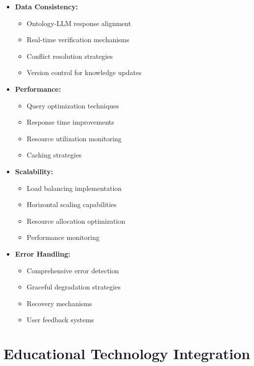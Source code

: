 \begin{itemize}
  \item \textbf{Data Consistency:} 
    \begin{itemize}
      \item Ontology-LLM response alignment
      \item Real-time verification mechanisms
      \item Conflict resolution strategies
      \item Version control for knowledge updates
    \end{itemize}
  
  \item \textbf{Performance:} 
    \begin{itemize}
      \item Query optimization techniques
      \item Response time improvements
      \item Resource utilization monitoring
      \item Caching strategies
    \end{itemize}
  
  \item \textbf{Scalability:} 
    \begin{itemize}
      \item Load balancing implementation
      \item Horizontal scaling capabilities
      \item Resource allocation optimization
      \item Performance monitoring
    \end{itemize}
  
  \item \textbf{Error Handling:} 
    \begin{itemize}
      \item Comprehensive error detection
      \item Graceful degradation strategies
      \item Recovery mechanisms
      \item User feedback systems
    \end{itemize}
\end{itemize}

\section{Educational Technology Integration}
\label{sec:ed-tech}

